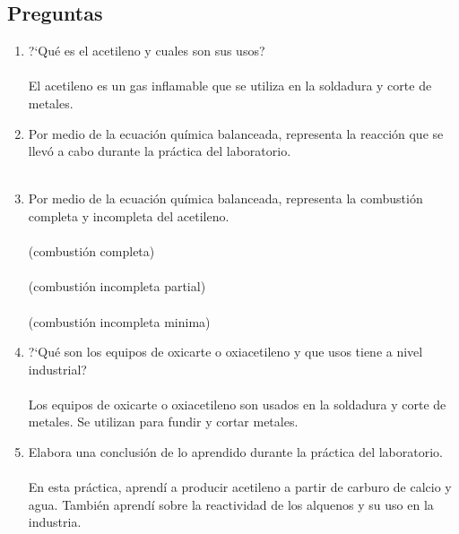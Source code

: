 \documentclass{article}
\begin{document}
\subsection{Preguntas}
\begin{enumerate}
      \item ?`Qu\'e es el acetileno y cuales son sus usos?
            \\~\\
            El acetileno es un gas inflamable que se utiliza en la soldadura y corte de metales.
      \item Por medio de la ecuaci\'on qu\'imica balanceada, representa la reacci\'on que se llev\'o a cabo durante la pr\'actica del laboratorio.
            \\~\\
      \item Por medio de la ecuaci\'on qu\'imica balanceada, representa la combusti\'on completa y incompleta del acetileno.
            \\~\\
             (combusti\'on completa)\\~\\
             (combusti\'on incompleta partial)
            \\~\\
             (combusti\'on incompleta minima)
      \item ?`Qu\'e son los equipos de oxicarte o oxiaceti\-leno y que usos tiene a nivel industrial?
            \\~\\
            Los equipos de oxicarte o oxiacetileno son usados en la soldadura y corte de metales. Se utilizan para fundir y cortar metales.
      \item Elabora una conclusi\'on de lo aprendido durante la pr\'actica del laboratorio.
            \\~\\
            En esta pr\'actica, aprend\'i a producir acetileno a partir de carburo de calcio y agua. Tambi\'en aprend\'i sobre la reactividad de los alquenos y su uso en la industria.
\end{enumerate}
\end{document}
